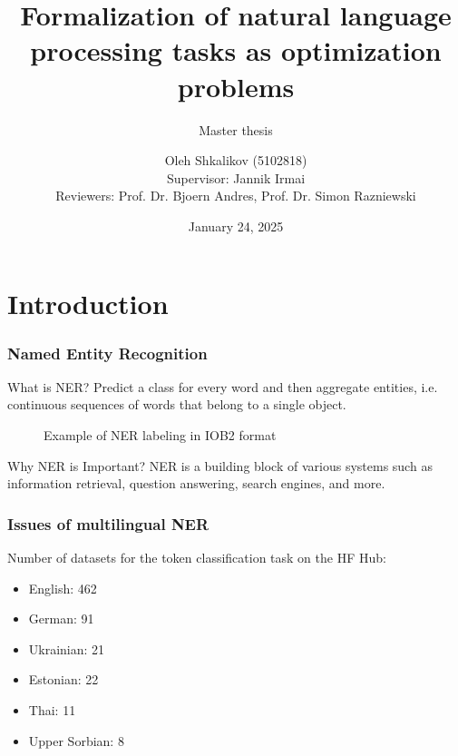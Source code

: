 \documentclass{beamer}
\title[XLNER]{Formalization of natural language processing tasks as optimization problems}
\subtitle{Master thesis}
\author[Oleh Shkalikov]{Oleh Shkalikov\texorpdfstring{ (5102818)
    \\[0.7em]{\small Supervisor: Jannik Irmai}
\\{\small Reviewers: Prof. Dr. Bjoern Andres, Prof. Dr. Simon Razniewski}}{}}
\institute[TU Dresden]{TU Dresden}
\date{January 24, 2025}
\begin{document}
\frame{\titlepage}


\section{Introduction}

\begin{frame}
  \frametitle{Named Entity Recognition}

  \begin{block}{What is NER?}
    Predict a class for every word and then aggregate entities, i.e.
    continuous sequences of words that belong to a single object.
  \end{block}
  \begin{figure}[ht]
    \centering
    \caption{Example of NER labeling in IOB2 format}
    \label{fig:ner}
  \end{figure}

  \begin{exampleblock}{Why NER is Important?}
    NER is a building block of various systems such as information retrieval,
    question answering, search engines, and more.
  \end{exampleblock}
\end{frame}

\begin{frame}
  \frametitle{Issues of multilingual NER}

  Number of datasets for the token classification task on the HF Hub:
  \begin{itemize}
    \item English: 462
    \item German: 91
    \item Ukrainian: 21
    \item Estonian: 22
    \item Thai: 11
    \item Upper Sorbian: 8
  \end{itemize}
\end{frame}
\end{document}
